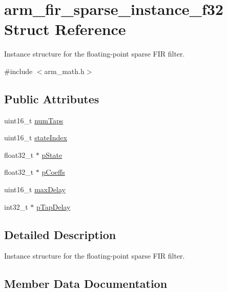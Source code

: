 \hypertarget{structarm__fir__sparse__instance__f32}{}\section{arm\+\_\+fir\+\_\+sparse\+\_\+instance\+\_\+f32 Struct Reference}
\label{structarm__fir__sparse__instance__f32}


Instance structure for the floating-\/point sparse F\+IR filter.  




{\ttfamily \#include $<$arm\+\_\+math.\+h$>$}

\subsection*{Public Attributes}
\begin{DoxyCompactItemize}
\item 
uint16\+\_\+t \hyperlink{structarm__fir__sparse__instance__f32_a5e19e7f234ac30a3db843352bf2a8515}{num\+Taps}
\item 
uint16\+\_\+t \hyperlink{structarm__fir__sparse__instance__f32_a57585aeca9dc8686e08df2865375a86d}{state\+Index}
\item 
float32\+\_\+t $\ast$ \hyperlink{structarm__fir__sparse__instance__f32_a794af0916666d11cc564d6df08553555}{p\+State}
\item 
float32\+\_\+t $\ast$ \hyperlink{structarm__fir__sparse__instance__f32_a04af7c738dfb0882ad102fcad501d94a}{p\+Coeffs}
\item 
uint16\+\_\+t \hyperlink{structarm__fir__sparse__instance__f32_af8b8c775f4084c36774f06c082b4c078}{max\+Delay}
\item 
int32\+\_\+t $\ast$ \hyperlink{structarm__fir__sparse__instance__f32_aaa54ae67e5d10c6dd0d697945c638d31}{p\+Tap\+Delay}
\end{DoxyCompactItemize}


\subsection{Detailed Description}
Instance structure for the floating-\/point sparse F\+IR filter. 

\subsection{Member Data Documentation}
